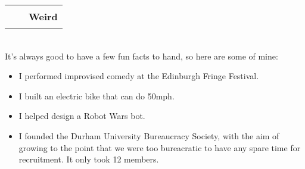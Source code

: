 \documentclass[hidelinks, 12pt, a4paper]{article}
\begin{document}
	\begin{tabularx}{\textwidth}{@{}Xrr@{}}&
		\rule{50pt}{1pt}&
		\textbf{Weird}
	\end{tabularx}\\

	It's always good to have a few fun facts to hand, so here are some of mine:
	
	\begin{itemize}
		\item \begin{small}I performed improvised comedy at the Edinburgh Fringe Festival.\end{small}
		
		\item \begin{small}I built an electric bike that can do 50mph.\end{small}
		
		\item \begin{small}I helped design a Robot Wars bot.\end{small}
		
		\item \begin{small}I founded the Durham University Bureaucracy Society, with the aim of growing to the point that we were too bureacratic to have any spare time for recruitment. It only took 12 members.\end{small}
	\end{itemize}
\end{document}
